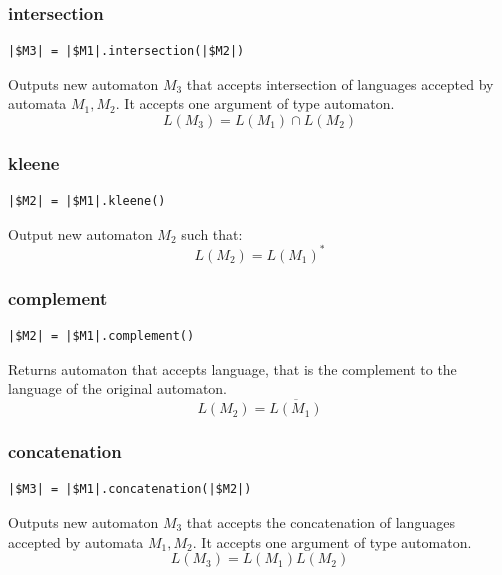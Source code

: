 \documentclass{ctuthesis}
\begin{document}
\subsubsection{intersection}
\begin{lstlisting}[language = JASL_snippet]
	|$M3| = |$M1|.intersection(|$M2|)
\end{lstlisting}

Outputs new automaton $M_3$ that accepts intersection of languages accepted by automata $M_1, M_2$. It accepts one argument of type automaton.
\begin{equation*}
	L(M_3) = L(M_1) \cap L(M_2)
\end{equation*}

\subsubsection{kleene}
\begin{lstlisting}[language = JASL_snippet]
	|$M2| = |$M1|.kleene()
\end{lstlisting}

Output new automaton $M_2$ such that:
\begin{equation*}
	L(M_2) = L(M_1)^*
\end{equation*}

\subsubsection{complement}
\begin{lstlisting}[language = JASL_snippet]
	|$M2| = |$M1|.complement()
\end{lstlisting}

Returns automaton that accepts language, that is the complement to the language of the original automaton.
\begin{equation*}
	L(M_2) = \overline{L(M_1)}
\end{equation*}

\subsubsection{concatenation}
\begin{lstlisting}[language = JASL_snippet]
	|$M3| = |$M1|.concatenation(|$M2|)
\end{lstlisting}

Outputs new automaton $M_3$ that accepts the concatenation of languages accepted by automata $M_1, M_2$. It accepts one argument of type automaton.
\begin{equation*}
	L(M_3) = L(M_1)L(M_2)
\end{equation*}
\end{document}
